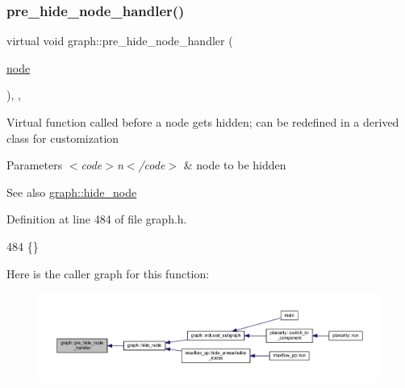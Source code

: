 \subsubsection{\texorpdfstring{pre\+\_\+hide\+\_\+node\+\_\+handler()}{pre\_hide\_node\_handler()}}
{\footnotesize\ttfamily virtual void graph\+::pre\+\_\+hide\+\_\+node\+\_\+handler (\begin{DoxyParamCaption}\item[{\mbox{\hyperlink{classnode}{node}}}]{ }\end{DoxyParamCaption})\hspace{0.3cm}{\ttfamily [inline]}, {\ttfamily [virtual]}, {\ttfamily [inherited]}}

Virtual function called before a node gets hidden; can be redefined in a derived class for customization


\begin{DoxyParams}{Parameters}
{\em $<$code$>$n$<$/code$>$} & node to be hidden \\
\hline
\end{DoxyParams}
\begin{DoxySeeAlso}{See also}
\mbox{\hyperlink{classgraph_a214618b5e3c02695779350532506e225}{graph\+::hide\+\_\+node}} 
\end{DoxySeeAlso}


Definition at line 484 of file graph.\+h.


\begin{DoxyCode}
484 \{\}          
\end{DoxyCode}
Here is the caller graph for this function\+:
\nopagebreak
\begin{figure}[H]
\begin{center}
\leavevmode
\includegraphics[width=350pt]{classgraph_ac169b1dca0b01c97e683302b3908fd49_icgraph}
\end{center}
\end{figure}
\mbox{\label{classgraph_a505198f412b1e426e9d09b62ea9811e8}} 

